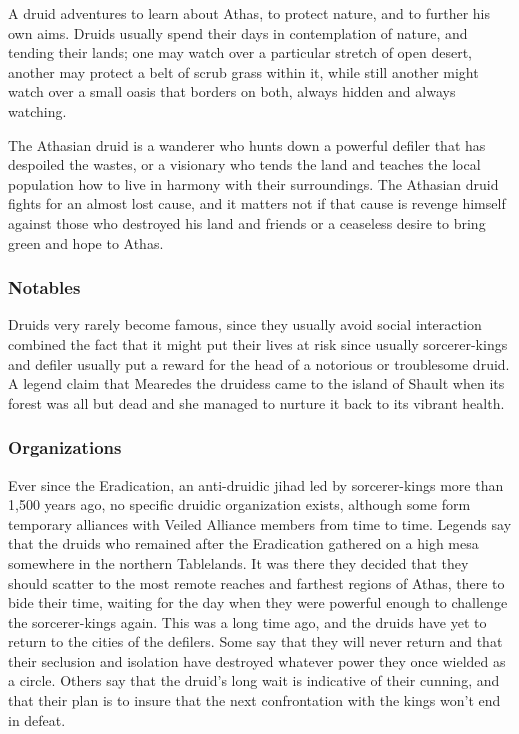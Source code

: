 A druid adventures to learn about Athas, to protect nature, and to further his own aims. Druids usually spend their days in contemplation of nature, and tending their lands; one may watch over a particular stretch of open desert, another may protect a belt of scrub grass within it, while still another might watch over a small oasis that borders on both, always hidden and always watching.

The Athasian druid is a wanderer who hunts down a powerful defiler that has despoiled the wastes, or a visionary who tends the land and teaches the local population how to live in harmony with their surroundings. The Athasian druid fights for an almost lost cause, and it matters not if that cause is revenge himself against those who destroyed his land and friends or a ceaseless desire to bring green and hope to Athas.

\subsubsection{Notables}

Druids very rarely become famous, since they usually avoid social interaction combined the fact that it might put their lives at risk since usually sorcerer-kings and defiler usually put a reward for the head of a notorious or troublesome druid. A legend claim that Mearedes the druidess came to the island of Shault when its forest was all but dead and she managed to nurture it back to its vibrant health.

\subsubsection{Organizations}

Ever since the Eradication, an anti-druidic jihad led by sorcerer-kings more than 1,500 years ago, no specific druidic organization exists, although some form temporary alliances with Veiled Alliance members from time to time. Legends say that the druids who remained after the Eradication gathered on a high mesa somewhere in the northern Tablelands. It was there they decided that they should scatter to the most remote reaches and farthest regions of Athas, there to bide their time, waiting for the day when they were powerful enough to challenge the sorcerer-kings again. This was a long time ago, and the druids have yet to return to the cities of the defilers. Some say that they will never return and that their seclusion and isolation have destroyed whatever power they once wielded as a circle. Others say that the druid's long wait is indicative of their cunning, and that their plan is to insure that the next confrontation with the kings won't end in defeat.

